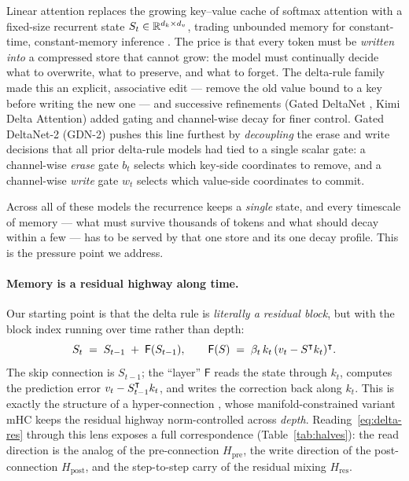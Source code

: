\documentclass[11pt,letterpaper,logo]{yalearxiv}
\newcommand{\Hres}{H_{\mathrm{res}}}
\newcommand{\Hpre}{H_{\mathrm{pre}}}
\newcommand{\Hpost}{H_{\mathrm{post}}}
\newcommand{\Fdelta}{\mathsf{F}}               %
\begin{document}
Linear attention replaces the growing key--value cache of softmax attention with a
fixed-size recurrent state $S_t \in \mathbb{R}^{d_k \times d_v}$, trading unbounded memory
for constant-time, constant-memory inference \citep{katharopoulos2020transformers}.
The price is that every token must be \emph{written into} a compressed store that
cannot grow: the model must continually decide what to overwrite, what to
preserve, and what to forget. The delta-rule family
\citep{schlag2021linear,yang2024parallelizing} made this an explicit, associative
edit --- remove the old value bound to a key before writing the new one --- and
successive refinements (Gated DeltaNet \citep{yang2024gdn}, Kimi Delta Attention)
added gating and channel-wise decay for finer control. Gated DeltaNet-2 (GDN-2)
\citep{hatamizadeh2026gdn2} pushes this line furthest by \emph{decoupling} the
erase and write decisions that all prior delta-rule models had tied to a single
scalar gate: a channel-wise \emph{erase} gate $b_t$ selects which key-side
coordinates to remove, and a channel-wise \emph{write} gate $w_t$ selects which
value-side coordinates to commit.

Across all of these models the recurrence keeps a \emph{single} state, and every
timescale of memory --- what must survive thousands of tokens and what should
decay within a few --- has to be served by that one store and its one decay
profile. This is the pressure point we address.

\paragraph{Memory is a residual highway along time.} Our starting point is that
the delta rule is \emph{literally a residual block}, but with the block index
running over time rather than depth:
\begin{equation}
  S_t \;=\; S_{t-1} \;+\; \Fdelta(S_{t-1}),
  \qquad
  \Fdelta(S) \;=\; \beta_t\, k_t\,(v_t - S^{\tr} k_t)^{\tr}.
  \label{eq:delta-res}
\end{equation}
The skip connection is $S_{t-1}$; the ``layer'' $\Fdelta$ reads the state through
$k_t$, computes the prediction error $v_t - S_{t-1}^{\intercal}k_t$, and writes the
correction back along $k_t$. This is exactly the structure of a hyper-connection
\citep{zhu2024hyperconnections}, whose manifold-constrained variant mHC
\citep{deepseek2025mhc} keeps the residual highway norm-controlled across
\emph{depth}. Reading~\eqref{eq:delta-res} through this lens exposes a full
correspondence (Table~\ref{tab:halves}): the read direction is the analog of the
pre-connection $\Hpre$, the write direction of the post-connection $\Hpost$, and
the step-to-step carry of the residual mixing $\Hres$.
\end{document}

